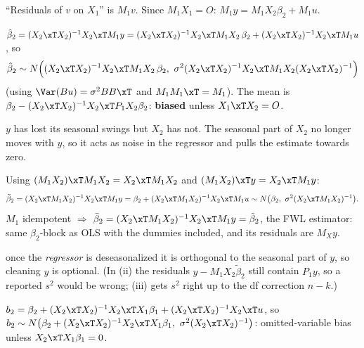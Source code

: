 \begin{solbox}
 ``Residuals of $v$ on $X_{1}$'' is $M_{1}v$. Since $M_{1}X_{1}=O$:
$M_{1}y = M_{1}X_{2}\beta_{2} + M_{1}u$.

$\hat\beta_{2} = (X_{2}\xT X_{2})^{-1}X_{2}\xT M_{1}y = (X_{2}\xT X_{2})^{-1}X_{2}\xT M_{1}X_{2}\,\beta_{2} + (X_{2}\xT X_{2})^{-1}X_{2}\xT M_{1}u$, so
\[
  \hat\beta_{2}\sim N\Big((X_{2}\xT X_{2})^{-1}X_{2}\xT M_{1}X_{2}\,\beta_{2},\ \sigma^{2}(X_{2}\xT X_{2})^{-1}X_{2}\xT M_{1}X_{2}(X_{2}\xT X_{2})^{-1}\Big)
\]
(using $\Var(Bu)=\sigma^{2}BB\xT$ and $M_{1}M_{1}\xT=M_{1}$). The mean is
$\beta_{2} - (X_{2}\xT X_{2})^{-1}X_{2}\xT P_{1}X_{2}\beta_{2}$: \textbf{biased} unless $X_{1}\xT X_{2}=O$.
\begin{why}\Why $y$ has lost its seasonal swings but $X_{2}$ has not. The seasonal part of $X_{2}$
no longer moves with $y$, so it acts as noise in the regressor and pulls the estimate towards zero.\end{why}

 Using $(M_{1}X_{2})\xT M_{1}X_{2} = X_{2}\xT M_{1}X_{2}$ and
$(M_{1}X_{2})\xT y = X_{2}\xT M_{1}y$:
\[
  \tilde\beta_{2} = (X_{2}\xT M_{1}X_{2})^{-1}X_{2}\xT M_{1}y = \beta_{2} + (X_{2}\xT M_{1}X_{2})^{-1}X_{2}\xT M_{1}u
  \sim N\big(\beta_{2},\ \sigma^{2}(X_{2}\xT M_{1}X_{2})^{-1}\big).
\]
 $M_{1}$ idempotent $\Rightarrow$ $\bar\beta_{2} = (X_{2}\xT M_{1}X_{2})^{-1}X_{2}\xT M_{1}y = \tilde\beta_{2}$,
the FWL estimator: same $\beta_{2}$-block as OLS with the dummies included, and its residuals are $M_{X}y$.
\begin{why}\Why once the \emph{regressor} is deseasonalized it is orthogonal to the seasonal part of $y$, so
cleaning $y$ is optional. (In (ii) the residuals $y - M_{1}X_{2}\tilde\beta_{2}$ still contain $P_{1}y$, so a
reported $s^{2}$ would be wrong; (iii) gets $s^{2}$ right up to the df correction $n-k$.)\end{why}

$b_{2} = \beta_{2} + (X_{2}\xT X_{2})^{-1}X_{2}\xT X_{1}\beta_{1} + (X_{2}\xT X_{2})^{-1}X_{2}\xT u$, so
$b_{2}\sim N\big(\beta_{2} + (X_{2}\xT X_{2})^{-1}X_{2}\xT X_{1}\beta_{1},\ \sigma^{2}(X_{2}\xT X_{2})^{-1}\big)$:
omitted-variable bias unless $X_{2}\xT X_{1}\beta_{1}=0$.


\end{solbox}
